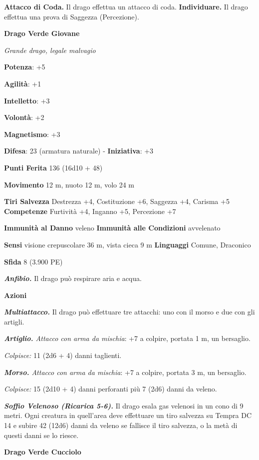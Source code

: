 \begin{multicols}{2}
\textbf{Attacco di Coda.} Il drago effettua un attacco di coda.
\textbf{Individuare.} Il drago effettua una prova di Saggezza
(Percezione).

\textbf{Drago Verde Giovane}

\emph{Grande drago, legale malvagio}

\textbf{Potenza}: +5

\textbf{Agilità}: +1

\textbf{Intelletto}: +3

\textbf{Volontà}: +2

\textbf{Magnetismo}: +3

\textbf{Difesa}: 23 (armatura naturale) - \textbf{Iniziativa}: +3

\textbf{Punti Ferita} 136 (16d10 + 48)

\textbf{Movimento} 12 m, nuoto 12 m, volo 24 m

\textbf{Tiri Salvezza} Destrezza +4, Costituzione +6, Saggezza +4,
Carisma +5 \textbf{Competenze} Furtività +4, Inganno +5, Percezione +7

\textbf{Immunità al Danno} veleno \textbf{Immunità alle Condizioni}
avvelenato

\textbf{Sensi} visione crepuscolare 36 m, vista cieca 9 m
\textbf{Linguaggi} Comune, Draconico

\textbf{Sfida} 8 (3.900 PE)\smallskip

\emph{\textbf{Anfibio.}} Il drago può respirare aria e acqua.

\smallskip\textbf{Azioni}

\emph{\textbf{Multiattacco.}} Il drago può effettuare tre attacchi: uno
con il morso e due con gli artigli.

\emph{\textbf{Artiglio.} Attacco con arma da mischia}: +7 a colpire,
portata 1 m, un bersaglio.

\emph{Colpisce:} 11 (2d6 + 4) danni taglienti.

\emph{\textbf{Morso.} Attacco con arma da mischia}: +7 a colpire,
portata 3 m, un bersaglio.

\emph{Colpisce:} 15 (2d10 + 4) danni perforanti più 7 (2d6) danni da
veleno.

\emph{\textbf{Soffio Velenoso (Ricarica 5-6).}} Il drago esala gas
velenosi in un cono di 9 metri. Ogni creatura in quell'area deve
effettuare un tiro salvezza su Tempra DC 14 e subire 42 (12d6)
danni da veleno se fallisce il tiro salvezza, o la metà di questi danni
se lo riesce.



\textbf{Drago Verde Cucciolo}


\end{multicols}
